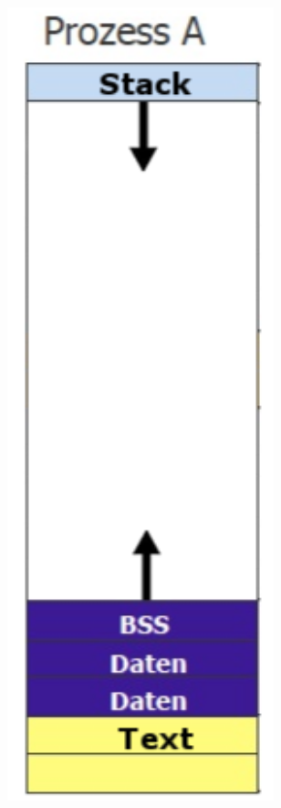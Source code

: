 \documentclass[ddcfooter,nosectionnum]{tudbeamer}
\begin{document}
\begin{frame}
\begin{minipage}[b] {0.29\textwidth}
\includegraphics[width=0.58\textwidth]{segmente.png}
\end{minipage} 
\end{frame}


%     
\end{document}
